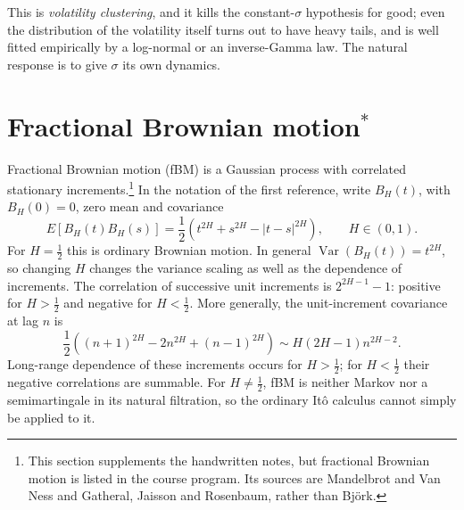 This is \emph{volatility clustering}, and it kills the constant-$\sigma$ hypothesis for good; even the distribution of the volatility itself turns out to have heavy tails, and is well fitted empirically by a log-normal or an inverse-Gamma law\cite{BouchaudPotters2003}.
The natural response is to give $\sigma$ its own dynamics.


\section[Fractional Brownian motion*]{Fractional Brownian motion\texorpdfstring{$^*$}{*}}\label{sec:fbm}

Fractional Brownian motion (fBM) is a Gaussian process with correlated stationary increments.\footnote{This section supplements the handwritten notes, but fractional Brownian motion is listed in the course program.
Its sources are Mandelbrot and Van Ness\cite{MandelbrotVanNess1968} and Gatheral, Jaisson and Rosenbaum\cite{GatheralEtAl2018}, rather than Bj\"ork.}
In the notation of the first reference, write $B_H(t)$, with $B_H(0)=0$, zero mean and covariance
\[
 E[B_H(t)B_H(s)]=\frac12\left(t^{2H}+s^{2H}-|t-s|^{2H}\right),\qquad H\in(0,1).
\]
For $H=\tfrac12$ this is ordinary Brownian motion.
In general $\operatorname{Var}(B_H(t))=t^{2H}$, so changing $H$ changes the variance scaling as well as the dependence of increments.
The correlation of successive unit increments is $2^{2H-1}-1$: positive for $H>\tfrac12$ and negative for $H<\tfrac12$.
More generally, the unit-increment covariance at lag $n$ is
\[
 \frac12\left((n+1)^{2H}-2n^{2H}+(n-1)^{2H}\right)
 \sim H(2H-1)n^{2H-2}.
\]
Long-range dependence of these increments occurs for $H>\tfrac12$; for $H<\tfrac12$ their negative correlations are summable.
For $H\ne\tfrac12$, fBM is neither Markov nor a semimartingale in its natural filtration, so the ordinary It\^o calculus cannot simply be applied to it.


